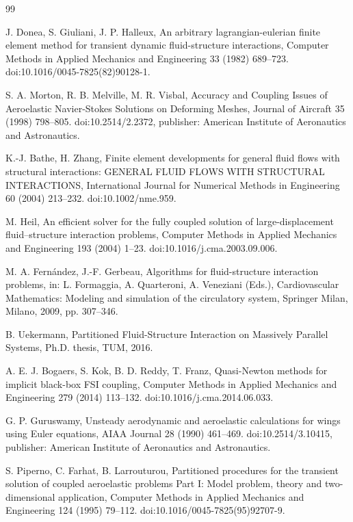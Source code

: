 \documentclass[11pt]{article}
\begin{document}
\begin{thebibliography}{99}

J. Donea, S. Giuliani, J. P. Halleux, An arbitrary lagrangian-eulerian finite element method for transient dynamic fluid-structure interactions, Computer Methods in Applied Mechanics and Engineering 33 (1982) 689--723. doi:10.1016/0045-7825(82)90128-1.

S. A. Morton, R. B. Melville, M. R. Visbal, Accuracy and Coupling Issues of Aeroelastic Navier-Stokes Solutions on Deforming Meshes, Journal of Aircraft 35 (1998) 798--805. doi:10.2514/2.2372, publisher: American Institute of Aeronautics and Astronautics.

K.-J. Bathe, H. Zhang, Finite element developments for general fluid flows with structural interactions: GENERAL FLUID FLOWS WITH STRUCTURAL INTERACTIONS, International Journal for Numerical Methods in Engineering 60 (2004) 213--232. doi:10.1002/nme.959.

M. Heil, An efficient solver for the fully coupled solution of large-displacement fluid--structure interaction problems, Computer Methods in Applied Mechanics and Engineering 193 (2004) 1--23. doi:10.1016/j.cma.2003.09.006.

M. A. Fern\'andez, J.-F. Gerbeau, Algorithms for fluid-structure interaction problems, in: L. Formaggia, A. Quarteroni, A. Veneziani (Eds.), Cardiovascular Mathematics: Modeling and simulation of the circulatory system, Springer Milan, Milano, 2009, pp. 307--346.

B. Uekermann, Partitioned Fluid-Structure Interaction on Massively Parallel Systems, Ph.D. thesis, TUM, 2016.

A. E. J. Bogaers, S. Kok, B. D. Reddy, T. Franz, Quasi-Newton methods for implicit black-box FSI coupling, Computer Methods in Applied Mechanics and Engineering 279 (2014) 113--132. doi:10.1016/j.cma.2014.06.033.

G. P. Guruswamy, Unsteady aerodynamic and aeroelastic calculations for wings using Euler equations, AIAA Journal 28 (1990) 461--469. doi:10.2514/3.10415, publisher: American Institute of Aeronautics and Astronautics.

S. Piperno, C. Farhat, B. Larrouturou, Partitioned procedures for the transient solution of coupled aeroelastic problems Part I: Model problem, theory and two-dimensional application, Computer Methods in Applied Mechanics and Engineering 124 (1995) 79--112. doi:10.1016/0045-7825(95)92707-9.


\end{thebibliography}
\end{document}
